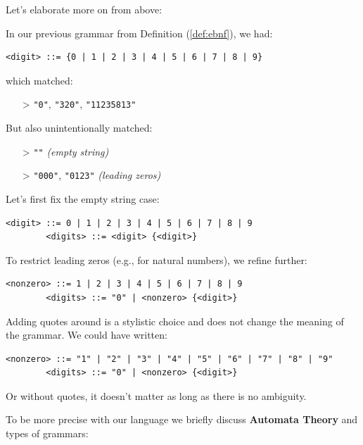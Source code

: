 \noindent
Let's elaborate more on  from above:
\begin{Example}

    In our previous grammar from Definition (\ref{def:ebnf}), we had:
    \begin{lstlisting}[numbers=none]
        <digit> ::= {0 | 1 | 2 | 3 | 4 | 5 | 6 | 7 | 8 | 9}
    \end{lstlisting}
    which matched:
    \begin{itemize}
        \item[>] \texttt{"0"}, \texttt{"320"}, \texttt{"11235813"}
    \end{itemize}

    \noindent
    But also unintentionally matched:
    \begin{itemize}
        \item[>] \texttt{""} \hfill \textit{(empty string)}
        \item[>] \texttt{"000"}, \texttt{"0123"} \hfill \textit{(leading zeros)}
    \end{itemize}
    
    \noindent
    Let's first fix the empty string case:
    \begin{lstlisting}[numbers=none]
        <digit> ::= 0 | 1 | 2 | 3 | 4 | 5 | 6 | 7 | 8 | 9
        <digits> ::= <digit> {<digit>}
    \end{lstlisting}

    \noindent
    To restrict leading zeros (e.g., for natural numbers), we refine further:
    \begin{lstlisting}[numbers=none]
        <nonzero> ::= 1 | 2 | 3 | 4 | 5 | 6 | 7 | 8 | 9
        <digits> ::= "0" | <nonzero> {<digit>}
    \end{lstlisting}

    \noindent
    Adding quotes around  is a stylistic choice and does not change the meaning of the grammar. We could have written:
    \begin{lstlisting}[numbers=none]
        <nonzero> ::= "1" | "2" | "3" | "4" | "5" | "6" | "7" | "8" | "9"
        <digits> ::= "0" | <nonzero> {<digit>}
    \end{lstlisting}
    \noindent
    Or without quotes, it doesn't matter as long as there is no ambiguity.
\end{Example}

\noindent
To be more precise with our language we briefly discuss \textbf{Automata Theory} and types of grammars:

